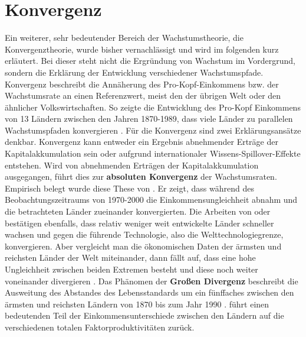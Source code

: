 
\chapter{Konvergenz}
Ein weiterer, sehr bedeutender Bereich der Wachstumstheorie, die Konvergenztheorie, wurde bisher vernachl{\"a}ssigt und wird im folgenden kurz erl{\"a}utert. Bei dieser steht nicht die Ergr{\"u}ndung von Wachstum im Vordergrund, sondern die Erkl{\"a}rung der Entwicklung verschiedener Wachstumspfade.\\ Konvergenz beschreibt die Ann{\"a}herung des Pro-Kopf-Einkommens bzw. der Wachstumsrate an einen Referenzwert, meist den der {\"u}brigen Welt oder den {\"a}hnlicher Volkswirtschaften. So zeigte die Entwicklung des Pro-Kopf Einkommens von 13 L{\"a}ndern zwischen den Jahren 1870-1989, dass viele L{\"a}nder zu parallelen Wachstumspfaden konvergieren \citep{Evans.1996}. F{\"u}r die Konvergenz sind zwei Erkl{\"a}rungsans{\"a}tze denkbar. Konvergenz kann entweder ein Ergebnis abnehmender Ertr{\"a}ge der Kapitalakkumulation sein oder aufgrund internationaler Wissens-Spillover-Effekte entstehen. \newline
Wird von abnehmenden Ertr{\"a}gen der Kapitalakkumulation ausgegangen, f{\"u}hrt dies zur \textbf{absoluten Konvergenz} der Wachstumsraten. Empirisch belegt wurde diese These von \citet{SalaiMartin.2002}. Er zeigt, dass w{\"a}hrend des Beobachtungszeitraums von 1970-2000 die Einkommensungleichheit abnahm und die betrachteten L{\"a}nder zueinander konvergierten. Die Arbeiten von \citet{Mankiw.1992} oder \citet{Barro.1997} best{\"a}tigen ebenfalls, dass relativ weniger weit entwickelte L{\"a}nder schneller wachsen und gegen die f{\"u}hrende Technologie, also die Welttechnologiegrenze, konvergieren.
Aber vergleicht man die {\"o}konomischen Daten der {\"a}rmsten und reichsten L{\"a}nder der Welt miteinander, dann f{\"a}llt auf, dass eine hohe Ungleichheit zwischen beiden Extremen besteht und diese noch weiter voneinander divergieren \citep{Maddison.2001}. Das Ph{\"a}nomen der \textbf{Gro{\ss}en Divergenz} beschreibt die Ausweitung des Abstandes des Lebensstandards um ein f{\"u}nffaches zwischen den {\"a}rmsten und reichsten L{\"a}ndern von 1870  bis zum Jahr 1990 \citep{Pritchett.1997}. \citet{Helpman.2004} f{\"u}hrt einen bedeutenden Teil der Einkommensunterschiede zwischen den L{\"a}ndern auf die verschiedenen totalen Faktorproduktivit{\"a}ten zur{\"u}ck.\\
